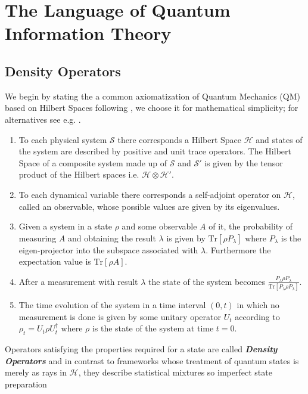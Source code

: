 \chapter{The Language of Quantum Information Theory}
% 
\section{Density Operators}
We begin by stating the a common axiomatization of Quantum Mechanics (QM) based on Hilbert Spaces following \cite{ballentine_quantum_2014}, we choose it for mathematical simplicity; for alternatives see e.g. \cite{reyes-lega_aspects_2015}.
\begin{enumerate}
        \item To each physical system $\mathcal{S}$ there corresponds a Hilbert Space $\mathcal{H}$ and states of the system are described by positive and unit trace operators. The Hilbert Space of a composite system made up of $\mathcal{S}$ and $\mathcal{S}'$
        is given by the tensor product of the Hilbert spaces i.e. $\mathcal{H}\otimes\mathcal{H}'$.
        \item To each dynamical variable there corresponds a self-adjoint operator on $\mathcal{H}$, called an observable, whose possible
        values are given by its eigenvalues.
        \item Given a system in a state $\rho$ and some observable $A$ of it, the probability of measuring $A$ and obtaining the result
        $\lambda$ is given by $\mathrm{Tr}[\rho P_{\lambda}]$ where $P_{\lambda}$ is the eigen-projector into the subspace associated with
        $\lambda$. Furthermore the expectation value is $\mathrm{Tr}[\rho A]$.
        \item After a measurement with result $\lambda$ the state of the system becomes $\frac{P_{\lambda}\rho P_{\lambda}}{\mathrm{Tr}[P_{\lambda}\rho
        P_{\lambda}]}$.
        \item The time evolution of the system in a time interval $(0,t)$ in which no measurement is done is given by some unitary operator
        $U_{t}$ according to $\rho_{t}=U_{t}\rho U_{t}^{\dagger}$ where $\rho$ is the state of the system at time $t=0$.
\end{enumerate}
Operators satisfying the properties required for a state are called \textit{\textbf{Density Operators}} and in contrast to frameworks
whose treatment of quantum states is merely as rays in $\mathcal{H}$, they describe statistical mixtures so imperfect state preparation
